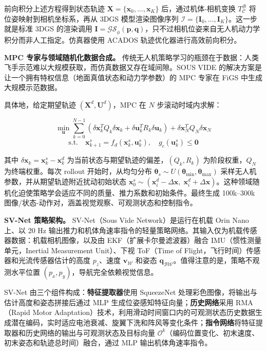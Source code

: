 前向积分上述方程得到状态轨迹 $\mathbf{X}=\{\bm{x}_0, \dots, \bm{x}_K\}$ 后，通过机体-相机变换 $T_\mathcal{C}^\mathcal{B}$ 将位姿映射到相机坐标系，再从 3DGS 模型渲染图像序列 $\bm{\mathcal{I}}=\{\bm{I}_0, \dots, \bm{I}_K\}$。这一步就是标准 3DGS 的渲染调用 $\bm{I} = \mathcal{GS}_\phi(\bm{p}, \bm{q})$，只不过相机位姿来自无人机动力学积分而非人工指定。仿真器使用 ACADOS 轨迹优化器进行高效前向积分。

\textbf{MPC 专家与领域随机化数据合成。}
传统无人机策略学习的瓶颈在于数据：人类飞手示范难以大规模获取，而仿真数据又存在域间隙。SOUS VIDE 的解决方案是让一个拥有特权信息（地面真值状态和动力学参数）的 MPC 专家在 FiGS 中生成大规模示范数据。

具体地，给定期望轨迹 $(\mathbf{X}^d, \mathbf{U}^d)$，MPC 在 $N$ 步滚动时域内求解：

\begin{equation}
\min_{\bm{u}} \sum_{k=0}^{N-1}(\delta\bm{x}_k^T Q_k \delta\bm{x}_k + \delta\bm{u}_k^T R_k \delta\bm{u}_k) + \delta\bm{x}_N^T Q_N \delta\bm{x}_N
\end{equation}
\begin{equation*}
\text{s.t.} \quad \bm{x}^s_{k+1} = f_d(\bm{x}^s_k, \bm{u}^s_k), \quad g_c(\bm{u}^s_k) \leq \bm{0}
\end{equation*}

其中 $\delta\bm{x}_k = \bm{x}^s_k - \bm{x}^d_k$ 为当前状态与期望轨迹的偏差，$(Q_k, R_k)$ 为阶段权重，$Q_N$ 为终端权重。每次 rollout 开始时，从均匀分布 $\bm{\theta}_s \sim U(\bm{\theta}_{\min}, \bm{\theta}_{\max})$ 采样无人机参数，并从期望轨迹附近扰动初始状态 $\bm{x}^s_0 \sim (\bm{x}^d_i - \Delta\bm{x},\; \bm{x}^d_i + \Delta\bm{x})$。这种领域随机化迫使策略学会适应不同的质量、推力系数和初始条件。最终生成 100k--300k 图像/状态-动作对，涵盖视觉观察、可观测状态和控制指令。

\textbf{SV-Net 策略架构。}
SV-Net（Sous Vide Network）是运行在机载 Orin Nano 上、以 20 Hz 输出推力和机体角速率指令的轻量策略网络。其输入仅为机载传感器数据：机载相机图像，以及由 EKF（扩展卡尔曼滤波器）融合 IMU（惯性测量单元，Inertial Measurement Unit）、下视 ToF（Time of Flight，飞行时间）传感器和光流传感器估计的高度 $p_z$、速度 $\bm{v}_\mathcal{W}$ 和姿态 $\bm{q}_{\mathcal{BW}}$。值得注意的是，策略不观测水平位置 $(p_x, p_y)$，导航完全依赖视觉信息。

SV-Net 由三个组件构成：\textbf{特征提取器}使用 SqueezeNet 处理彩色图像，将输出与估计高度和姿态拼接后通过 MLP 生成位姿感知特征向量；\textbf{历史网络}采用 RMA（Rapid Motor Adaptation）技术，利用滑动时间窗口内的可观测状态历史数据生成潜在编码，实时适应电池衰减、旋翼下洗和阵风等变化条件；\textbf{指令网络}将特征提取器和历史网络的输出与可观测状态及目标向量 $\mathcal{O}^k$（编码位置变化、初末速度、初末姿态和轨迹总时间）融合，通过 MLP 输出机体角速率指令。

